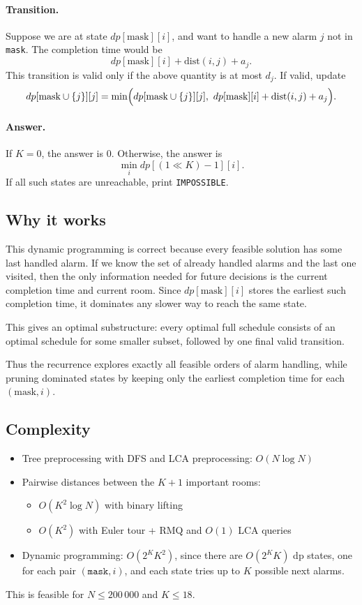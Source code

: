 \documentclass[11pt]{article}
\begin{document}
\paragraph{Transition.}
Suppose we are at state $dp[\text{mask}][i]$, and want to handle a new alarm $j$ not in \texttt{mask}. The completion time would be
\[
dp[\text{mask}][i]+\mathrm{dist}(i,j)+a_j.
\]
This transition is valid only if the above quantity is at most $d_j$. If valid, update
\[
dp[\text{mask}\cup\{j\}][j]=\min\Bigl(dp[\text{mask}\cup\{j\}][j],\ dp[\text{mask}][i]+\mathrm{dist}(i,j)+a_j\Bigr).
\]

\paragraph{Answer.}
If $K=0$, the answer is $0$. Otherwise, the answer is
\[
\min_i dp[(1\ll K)-1][i].
\]
If all such states are unreachable, print \texttt{IMPOSSIBLE}.

\subsection*{Why it works}
This dynamic programming is correct because every feasible solution has some last handled alarm. If we know the set of already handled alarms and the last one visited, then the only information needed for future decisions is the current completion time and current room. Since $dp[\text{mask}][i]$ stores the earliest such completion time, it dominates any slower way to reach the same state.

This gives an optimal substructure: every optimal full schedule consists of an optimal schedule for some smaller subset, followed by one final valid transition.

Thus the recurrence explores exactly all feasible orders of alarm handling, while pruning dominated states by keeping only the earliest completion time for each $(\text{mask},i)$.

\subsection*{Complexity}

\begin{itemize}
    \item Tree preprocessing with DFS and LCA preprocessing: $O(N\log N)$
    \item Pairwise distances between the $K+1$ important rooms:
    \begin{itemize}
        \item $O(K^2\log N)$ with binary lifting
        \item $O(K^2)$ with Euler tour + RMQ and $O(1)$ LCA queries
    \end{itemize}
    \item Dynamic programming: $O(2^K K^2)$, since there are $O(2^K K)$ dp states, one for each pair $(\texttt{mask}, i)$, and each state tries up to $K$ possible next alarms.
\end{itemize}
This is feasible for $N \le 200\,000$ and $K \le 18$.
\end{document}
